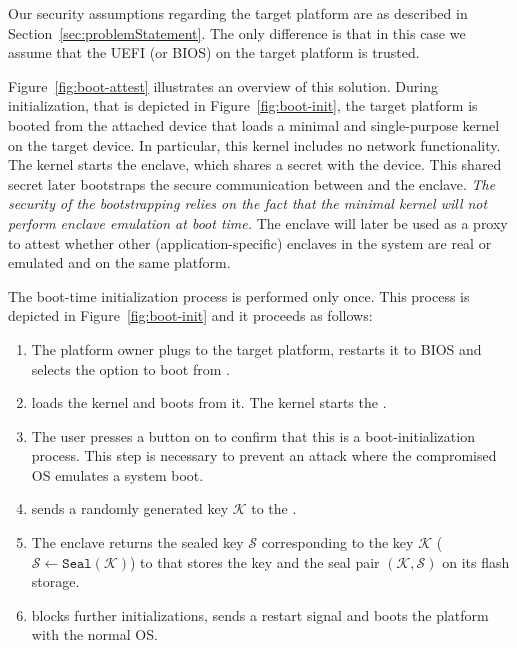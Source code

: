 Our security assumptions regarding the target platform are as described in Section~\ref{sec:problemStatement}. The only difference is that in this case we assume that the UEFI (or BIOS) on the target platform is trusted.


Figure~\ref{fig:boot-attest} illustrates an overview of this solution. During initialization, that is depicted in Figure~\ref{fig:boot-init}, the target platform is booted from the attached device that loads a minimal and single-purpose \name kernel on the target device. In particular, this kernel includes no network functionality. The kernel starts the \name enclave, which shares a secret with the device. This shared secret later bootstraps the secure communication between \device and the \name enclave. \emph{The security of the bootstrapping relies on the fact that the minimal kernel will not perform enclave emulation at boot time.} The \name enclave will later be used as a proxy to attest whether other (application-specific) enclaves in the system are real or emulated and on the same platform.


 The boot-time initialization process is performed only once.
This process is depicted in Figure~\ref{fig:boot-init} and it proceeds as follows:


\begin{enumerate}
  \item[\one] The platform owner plugs \device to the target platform, restarts it to BIOS and selects the option to boot from \device.
  \item[\two] \device loads the \name kernel and boots from it. The \name kernel starts the \nameclave.
  \item[\three] The user presses a button on \device to confirm that this is a boot-initialization process. This step is necessary to prevent an attack where the compromised OS emulates a system boot.
  \item[\four] \device sends a randomly generated key $\mathcal{K}$ to the \nameclave.
  \item[\five] The enclave returns the sealed key $\mathcal{S}$ corresponding to the key $\mathcal{K}$ ($\mathcal{S}\leftarrow\texttt{Seal}(\mathcal{K})$) to \device that stores the key and the seal pair $(\mathcal{K}, \mathcal{S})$ on its flash storage.
  \item[\six] \device blocks further initializations, sends a restart signal and boots the platform with the normal OS.
\end{enumerate}


